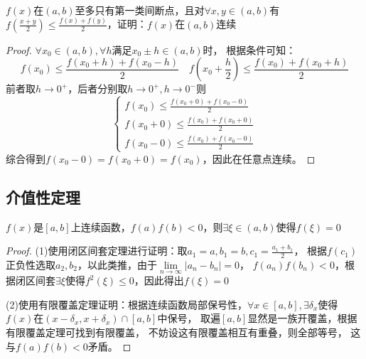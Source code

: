 ~

\begin{exercise}[第一类间断点的经典题目]
  $f(x)$在$(a,b)$至多只有第一类间断点，且对$\forall x,y \in (a,b)$有$f \left( \frac{x + y}{2} \right) \leq \frac{f(x) + f(y)}{2}$，证明：$f(x)$在$(a,b)$连续
\end{exercise}

\begin{proof}
  $\forall x_0 \in (a,b), \forall h$满足$x_0 \pm h \in (a,b)$时，
  根据条件可知：
  \begin{equation*}
    f(x_0) \leq \frac{f(x_0 + h) + f(x_0 - h)}{2} \quad f(x_0 + \frac{h}{2}) \leq \frac{f(x_0) + f(x_0 + h)}{2}
  \end{equation*}
  前者取$h \rightarrow 0^+$，后者分别取$h \rightarrow 0^+, h \rightarrow 0^-$则
  \begin{equation*}
    \begin{cases}
      f(x_0) \leq \frac{f(x_0 + 0) + f(x_0 - 0)}{2}\\
      f(x_0 + 0) \leq \frac{f(x_0) + f(x_0 + 0)}{2}\\
      f(x_0 - 0) \leq \frac{f(x_0) + f(x_0 - 0)}{2}
    \end{cases}
  \end{equation*}
  综合得到$f(x_0 - 0) = f(x_0 + 0) = f(x_0)$，因此在任意点连续。
\end{proof}

\subsection{介值性定理}

\begin{theorem}[零点存在定理]
  $f(x)$是$[a,b]$上连续函数，$f(a)f(b) < 0$，则$\exists \xi \in (a,b)$使得$f(\xi) = 0$
\end{theorem}

\begin{proof}
  (1)使用闭区间套定理进行证明：取$a_1 = a, b_1 = b, c_1 = \frac{a_1 + b_1}{2}$，
  根据$f(c_1)$正负性选取$a_2,b_2$，以此类推，由于$\lim \limits _{n \rightarrow \infty} |a_n - b_n| = 0$，
  $f(a_n)f(b_n) < 0$，根据闭区间套$\exists \xi$使得$f^2(\xi) \leq 0$，因此得出$f(\xi) = 0$

  (2)使用有限覆盖定理证明：根据连续函数局部保号性，$\forall x \in [a,b], \exists \delta_x$使得$f(x)$在$(x-\delta_x ,x + \delta_x) \cap [a,b]$中保号，
  取遍$[a,b]$显然是一族开覆盖，根据有限覆盖定理可找到有限覆盖，
  不妨设这有限覆盖相互有重叠，则全部等号，
  这与$f(a)f(b) < 0$矛盾。
\end{proof}

